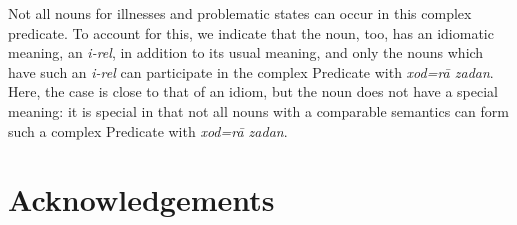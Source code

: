 \documentclass[output=paper]{langsci/langscibook}
\begin{document}
	
	
	Not all nouns for illnesses and problematic states can occur in this complex predicate. To account for this, we indicate that the noun, too, has an idiomatic meaning, an \textit{i-rel}, in addition to its usual meaning, and only the nouns which have such an \textit{i-rel} can participate in the complex Predicate with \textit{xod=r\=a zadan}. Here, the case is close to that of an idiom, but the noun does not have a special meaning: it is special in that not all nouns with a comparable semantics can form such a complex Predicate with \textit{xod=r\=a zadan}.
	

	
	
\section*{Acknowledgements}

{\sloppy
	\printbibliography[heading=subbibliography,notkeyword=this]
}
\end{document}
